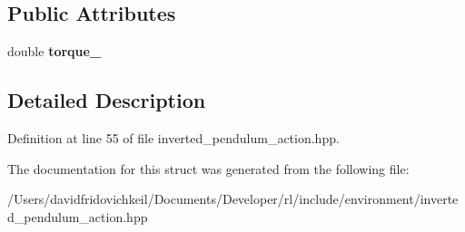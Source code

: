 \subsection*{Public Attributes}
\begin{DoxyCompactItemize}
\item 
\hypertarget{structrl_1_1_inverted_pendulum_action_a06cb28fd3554985bfd6686e43749ba73}{}\label{structrl_1_1_inverted_pendulum_action_a06cb28fd3554985bfd6686e43749ba73} 
double {\bfseries torque\+\_\+}
\end{DoxyCompactItemize}


\subsection{Detailed Description}


Definition at line 55 of file inverted\+\_\+pendulum\+\_\+action.\+hpp.



The documentation for this struct was generated from the following file\+:\begin{DoxyCompactItemize}
\item 
/\+Users/davidfridovichkeil/\+Documents/\+Developer/rl/include/environment/inverted\+\_\+pendulum\+\_\+action.\+hpp\end{DoxyCompactItemize}

